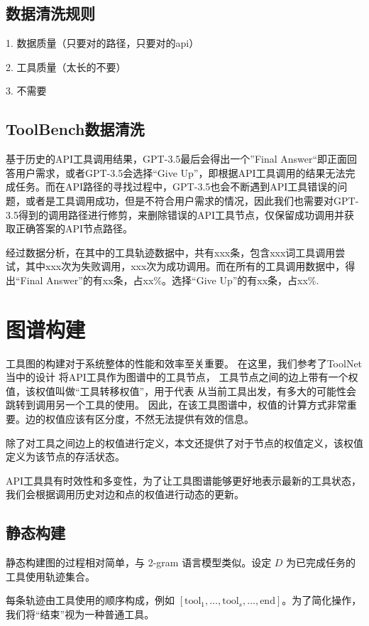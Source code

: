\subsection{数据清洗规则}

1. 数据质量（只要对的路径，只要对的api）

2. 工具质量（太长的不要）

3. 不需要 

\subsection{ToolBench数据清洗}

基于历史的API工具调用结果，GPT-3.5最后会得出一个”Final Answer“即正面回答用户需求，或者GPT-3.5会选择“Give Up”，即根据API工具调用的结果无法完成任务。而在API路径的寻找过程中，GPT-3.5也会不断遇到API工具错误的问题，或者是工具调用成功，但是不符合用户需求的情况，因此我们也需要对GPT-3.5得到的调用路径进行修剪，来删除错误的API工具节点，仅保留成功调用并获取正确答案的API节点路径。

经过数据分析，在其中的工具轨迹数据中，共有xxx条，包含xxx词工具调用尝试，其中xxx次为失败调用，xxx次为成功调用。而在所有的工具调用数据中，得出“Final Answer”的有xx条，占xx\%。选择“Give Up”的有xx条，占xx\%.

\section{图谱构建}

工具图的构建对于系统整体的性能和效率至关重要。
在这里，我们参考了ToolNet当中的设计\cite{Liu2024}
将API工具作为图谱中的工具节点，
工具节点之间的边上带有一个权值，该权值叫做“工具转移权值”，用于代表
从当前工具出发，有多大的可能性会跳转到调用另一个工具的使用。
因此，在该工具图谱中，权值的计算方式非常重要。边的权值应该有区分度，不然无法提供有效的信息。

除了对工具之间边上的权值进行定义，本文还提供了对于节点的权值定义，该权值定义为该节点的存活状态。

API工具具有时效性和多变性，为了让工具图谱能够更好地表示最新的工具状态，我们会根据调用历史对边和点的权值进行动态的更新。

\subsection{静态构建} 

静态构建图的过程相对简单，与 2-gram 语言模型类似。设定 $D$ 为已完成任务的工具使用轨迹集合。

每条轨迹由工具使用的顺序构成，例如 $[\text{tool}_1, \dots, \text{tool}_s, \dots, \text{end}]$。为了简化操作，我们将“结束”视为一种普通工具。

